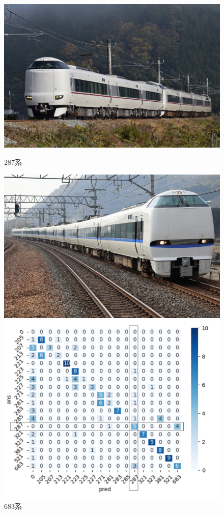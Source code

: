 \newpage
\begin{figure}[htbp]
	\centering
	\begin{minipage}[b]{0.25\linewidth}
		\centering
		\includegraphics[width=\linewidth]{fig/287.jpg}
		\caption{287系}
		\includegraphics[width=\linewidth]{fig/683.jpg}
		\caption{683系}
	\end{minipage}
    \begin{minipage}[b]{0.5\linewidth}
		\centering
		\includegraphics[width=\linewidth]{fig/predict_results.png}

\end{minipage}
\end{figure}
